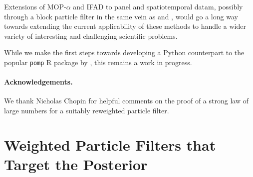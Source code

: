 \documentclass{article}
\begin{document}
Extensions of MOP-$\alpha$ and IFAD to panel and spatiotemporal datam, possibly through a block particle filter in the same vein as \cite{ionides22} and \cite{ning23}, would go a long way towards extending the current applicability of these methods to handle a wider variety of interesting and challenging scientific problems. 

While we make the first steps towards developing a Python counterpart to the popular \texttt{pomp} R package by \citet{king16, king2017pompmanual}, this remains a work in progress. 

\paragraph{Acknowledgements.} We thank Nicholas Chopin for helpful comments on the proof of a strong law of large numbers for a suitably reweighted particle filter. 





\appendix
\renewcommand{\thefigure}{A\arabic{figure}}
\setcounter{figure}{0}

\section{Weighted Particle Filters that Target the Posterior}
\end{document}
